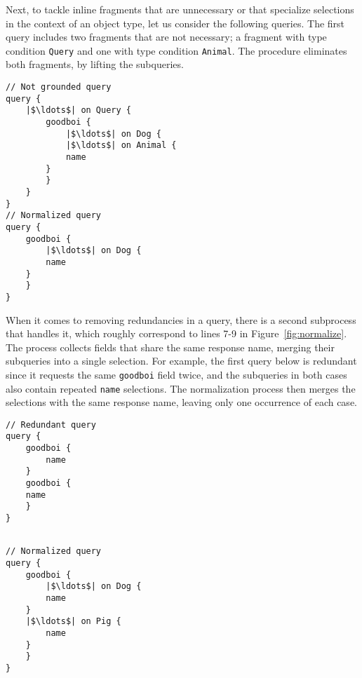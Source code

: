 \iffalse
\td{This is the same example as above, so it can be reused}
\begin{verbatim}
// Not grounded query
query {
    goodboi {
        name
    }
}
// Normalized query
query {
    goodboi {
        |$\ldots$| on Dog {
	    name
	}
	|$\ldots$| on Pig {
	    name
	}
    }	
}
\end{verbatim} 
\fi


 Next, to tackle inline fragments that are unnecessary or that specialize selections in the context of an object type, let us consider the following queries. The first query includes two fragments that are not necessary; a fragment with type condition \texttt{Query} and one with type condition \texttt{Animal}. The procedure eliminates both fragments, by lifting the subqueries.

\begin{verbatim}
// Not grounded query
query {
    |$\ldots$| on Query {
        goodboi {
            |$\ldots$| on Dog {
	        |$\ldots$| on Animal {
		    name
		}
	    }
	}
}
// Normalized query
query {
    goodboi {
        |$\ldots$| on Dog {
	    name
	}
    }	
}
\end{verbatim} 

When it comes to removing redundancies in a query, there is a second subprocess that handles it, which roughly correspond to lines 7-9 in Figure~\ref{fig:normalize}. The process collects fields that share the same response name, merging their subqueries into a single selection. For example, the first query below is redundant since it requests the same \texttt{goodboi} field twice, and the subqueries in both cases also contain repeated \texttt{name} selections. The normalization process then merges the selections with the same response name, leaving only one occurrence of each case.

\begin{minipage}[t]{.25\textwidth}
\begin{verbatim}
// Redundant query
query {
    goodboi {
        name
    }
    goodboi { 
 	name
    } 
}
\end{verbatim}
\end{minipage}%
\begin{minipage}[t]{.25\textwidth}
\begin{verbatim}

// Normalized query
query {
    goodboi {
        |$\ldots$| on Dog {
	    name
	}
	|$\ldots$| on Pig {
	    name
	}
    }	
}
\end{verbatim} 
\end{minipage}

